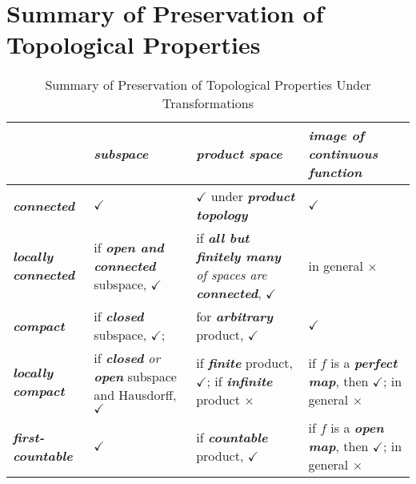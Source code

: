 \documentclass[11pt]{article}
\begin{document}
\section{Summary of Preservation of Topological Properties}
\begin{table}[h!]
\setlength{\abovedisplayskip}{0pt}
\setlength{\belowdisplayskip}{-10pt}
\setlength{\abovedisplayshortskip}{0pt}
\setlength{\belowdisplayshortskip}{0pt}
\footnotesize
\centering
\caption{Summary of Preservation of Topological Properties Under Transformations}
\label{tab: preservation}
\renewcommand\tabularxcolumn[1]{m{#1}}
\small
\begin{tabularx}{1\textwidth} { 
  | >{\raggedright\arraybackslash} m{3cm}
  | >{\centering\arraybackslash}X
  | >{\centering\arraybackslash}X
  | >{\centering\arraybackslash}X  | }
 \hline
  &  \emph{\textbf{subspace}} &  \emph{\textbf{product space}} &  \emph{\textbf{image of continuous function}}   \\
  \hline \vspace{5pt}
\emph{\textbf{connected}}  \vspace{2pt} & $\checkmark$  &   $\checkmark$ under \emph{\textbf{product topology}}  &   $\checkmark$  \\
\hline \vspace{5pt}
\emph{\textbf{locally connected}}  \vspace{2pt} & if \emph{\textbf{open and connected}} subspace, $\checkmark$  & if \emph{\textbf{all but finitely many} of spaces are \textbf{connected}},  $\checkmark$  & in general  $\times$  \\
 \hline \vspace{5pt}
\emph{\textbf{compact}}  \vspace{2pt} & if \emph{\textbf{closed}} subspace, $\checkmark$;  & for \emph{\textbf{arbitrary}} product, $\checkmark$ & $\checkmark$ \\
 \hline \vspace{5pt}
\emph{\textbf{locally compact}}  \vspace{2pt} & if \emph{\textbf{closed} or \textbf{open}} subspace and Hausdorff, $\checkmark$  & if \emph{\textbf{finite}} product, $\checkmark$; if \emph{\textbf{infinite}} product $\times$ & if $f$ is a \emph{\textbf{perfect map}}, then $\checkmark$; in general $\times$ \\
 \hline \vspace{5pt}
\emph{\textbf{first-countable}} \vspace{2pt}  &  $\checkmark$ & if \emph{\textbf{countable}} product, $\checkmark$ &  if $f$ is a \emph{\textbf{open map}}, then $\checkmark$; in general $\times$ \\

\end{tabularx}
\end{table}
\end{document}
